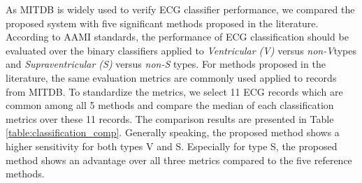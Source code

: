 \begin{table}[t]
\centering
\caption{Classification Performance and Within-Set Variation of Proposed System}
\label{table:variation}
\end{table}

As MITDB is widely used to verify ECG classifier performance, we compared the proposed system with five significant methods proposed in the literature. According to AAMI standards, the performance of ECG classification should be evaluated over the binary classifiers applied to \textit{Ventricular (V)} versus \textit{non-V}types and \textit{Supraventricular (S)} versus \textit{non-S} types. For methods proposed in the literature, the same evaluation metrics are commonly used applied to records from MITDB. To standardize the metrics, we select 11 ECG records which are common among all 5 methods and compare the median of each classification metrics over these 11 records. The comparison results are presented in Table \ref{table:classification_comp}. Generally speaking, the proposed method shows a higher sensitivity for both types V and S. Especially for type S, the proposed method shows an advantage over all three metrics compared to the five reference methods.



